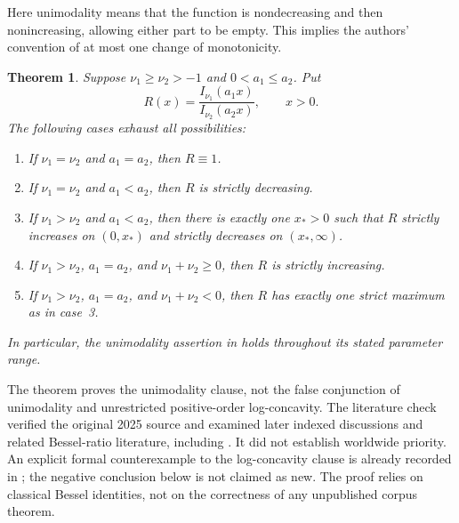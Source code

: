 \documentclass[11pt,a4paper]{article}
\newtheorem{theorem}{Theorem}[section]
\theoremstyle{remark}\newtheorem{remark}[theorem]{Remark}
\numberwithin{equation}{section}
\begin{document}
Here unimodality means that the function is nondecreasing and then
nonincreasing, allowing either part to be empty. This implies the
authors' convention of at most one change of monotonicity.

\begin{theorem}\label{bessel-thm:main}
Suppose $\nu_1\ge\nu_2>-1$ and $0<a_1\le a_2$. Put
\[
 R(x)=\frac{I_{\nu_1}(a_1x)}{I_{\nu_2}(a_2x)},\qquad x>0.
\]
The following cases exhaust all possibilities:
\begin{enumerate}
\item If $\nu_1=\nu_2$ and $a_1=a_2$, then $R\equiv1$.
\item If $\nu_1=\nu_2$ and $a_1<a_2$, then $R$ is strictly decreasing.
\item If $\nu_1>\nu_2$ and $a_1<a_2$, then there is exactly one
$x_*>0$ such that $R$ strictly increases on $(0,x_*)$ and strictly
decreases on $(x_*,\infty)$.
\item If $\nu_1>\nu_2$, $a_1=a_2$, and $\nu_1+\nu_2\ge0$,
then $R$ is strictly increasing.
\item If $\nu_1>\nu_2$, $a_1=a_2$, and $\nu_1+\nu_2<0$,
then $R$ has exactly one strict maximum as in case~3.
\end{enumerate}
In particular, the unimodality assertion in \cite[Conjecture~1]{bessel-KVZ}
holds throughout its stated parameter range.
\end{theorem}

The theorem proves the unimodality clause, not the false conjunction
of unimodality and unrestricted positive-order log-concavity.
The literature check verified the original 2025 source and examined
later indexed discussions and related Bessel-ratio literature, including
\cite{bessel-Segura}. It did not establish worldwide priority. An explicit
formal counterexample to the log-concavity clause is already recorded
in \cite{bessel-TT}; the negative conclusion below is not claimed as new.
The proof relies on classical Bessel identities, not on the correctness
of any unpublished corpus theorem.
\end{document}
